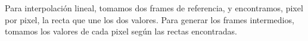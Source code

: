 \par Para interpolaci\'on lineal, tomamos dos frames de referencia, y encontramos, pixel por pixel, la recta que une los dos valores.
Para generar los frames intermedios, tomamos los valores de cada pixel seg\'un las rectas encontradas.

